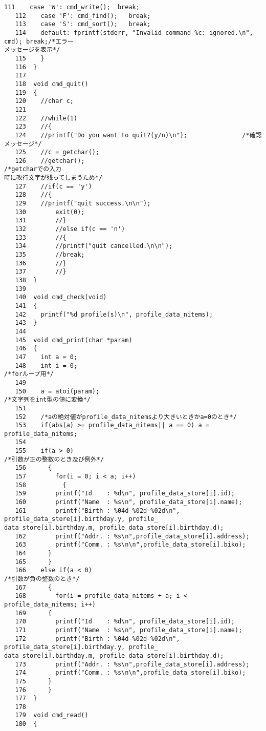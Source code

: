 \begin{Verbatim}[fontsize=\small, baselinestretch=0.8]
   111	  case 'W': cmd_write();  break;
   112	  case 'F': cmd_find();   break;
   113	  case 'S': cmd_sort();   break;
   114	  default: fprintf(stderr, "Invalid command %c: ignored.\n", cmd); break;/*エラー
メッセージを表示*/
   115	  }
   116	}
   117	
   118	void cmd_quit()
   119	{
   120	  //char c;
   121	
   122	  //while(1)
   123	  //{
   124	  //printf("Do you want to quit?(y/n)\n");               /*確認メッセージ*/
   125	  //c = getchar();
   126	  //getchar();                                           /*getcharでの入力
時に改行文字が残ってしまうため*/
   127	  //if(c == 'y')
   128	  //{
   129	  //printf("quit success.\n\n");
   130		  exit(0);
   131		  //}
   132		  //else if(c == 'n')
   133		  //{
   134		  //printf("quit cancelled.\n\n");
   135		  //break;
   136		  //}
   137		  //}
   138	}
   139	
   140	void cmd_check(void)
   141	{
   142	  printf("%d profile(s)\n", profile_data_nitems);
   143	}
   144	
   145	void cmd_print(char *param)
   146	{
   147	  int a = 0;
   148	  int i = 0;                                                 /*forループ用*/
   149	
   150	  a = atoi(param);                                           /*文字列をint型の値に変換*/
   151	
   152	  /*aの絶対値がprofile_data_nitemsより大きいときかa=0のとき*/
   153	  if(abs(a) >= profile_data_nitems|| a == 0) a = profile_data_nitems;
   154	
   155	  if(a > 0)                                                  /*引数が正の整数のとき及び例外*/
   156	    {
   157	      for(i = 0; i < a; i++)
   158	        {
   159		  printf("Id    : %d\n", profile_data_store[i].id);
   160		  printf("Name  : %s\n", profile_data_store[i].name);
   161		  printf("Birth : %04d-%02d-%02d\n", profile_data_store[i].birthday.y, profile_
data_store[i].birthday.m, profile_data_store[i].birthday.d);
   162		  printf("Addr. : %s\n",profile_data_store[i].address);
   163		  printf("Comm. : %s\n\n",profile_data_store[i].biko);
   164		}
   165	    }
   166	  else if(a < 0)                                             /*引数が負の整数のとき*/
   167	    {
   168	      for(i = profile_data_nitems + a; i < profile_data_nitems; i++)
   169		{
   170		  printf("Id    : %d\n", profile_data_store[i].id);
   171		  printf("Name  : %s\n", profile_data_store[i].name);
   172		  printf("Birth : %04d-%02d-%02d\n", profile_data_store[i].birthday.y, profile_
data_store[i].birthday.m, profile_data_store[i].birthday.d);
   173		  printf("Addr. : %s\n",profile_data_store[i].address);
   174		  printf("Comm. : %s\n\n",profile_data_store[i].biko);
   175		}
   176	    }
   177	}
   178	
   179	void cmd_read()
   180	{

\end{Verbatim}
